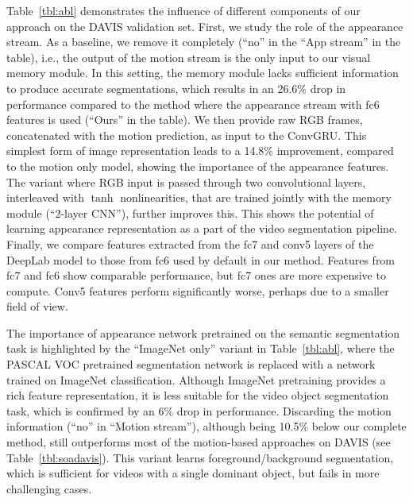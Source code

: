 \documentclass[10pt,twocolumn,letterpaper]{article}
\begin{document}
Table~\ref{tbl:abl} demonstrates the influence of different components of our
approach on the DAVIS validation set. First, we study the role of the
appearance stream. As a baseline, we remove it completely (``no'' in the ``App
stream'' in the table), i.e., the output of the motion stream is the only input
to our visual memory module. In this setting, the memory module lacks
sufficient information to produce accurate segmentations, which results in an
26.6\% drop in performance compared to the method where the appearance stream
with fc6 features is used (``Ours'' in the table). We then provide raw RGB
frames, concatenated with the motion prediction, as input to the ConvGRU. This
simplest form of image representation leads to a 14.8\% improvement, compared
to the motion only model, showing the importance of the appearance features.
The variant where RGB input is passed through two convolutional layers,
interleaved with $\tanh$ nonlinearities, that are trained jointly with the
memory module (``2-layer CNN''), further improves this. This shows the
potential of learning appearance representation as a part of the video
segmentation pipeline. Finally, we compare features extracted from the fc7 and
conv5 layers of the DeepLab model to those from fc6 used by default in our
method. Features from fc7 and fc6 show comparable performance, but fc7 ones are
more expensive to compute. Conv5 features perform significantly worse, perhaps
due to a smaller field of view.

The importance of appearance network pretrained on the semantic segmentation
task is highlighted by the ``ImageNet only'' variant in Table~\ref{tbl:abl},
where the PASCAL VOC pretrained segmentation network is replaced with a network
trained on ImageNet classification. Although ImageNet pretraining provides a
rich feature representation, it is less suitable for the video object
segmentation task, which is confirmed by an 6\% drop in performance. Discarding
the motion information (``no'' in ``Motion stream''), although being 10.5\%
below our complete method, still outperforms most of the motion-based
approaches on DAVIS (see Table~\ref{tbl:soadavis}). This variant learns
foreground/background segmentation, which is sufficient for videos with a
single dominant object, but fails in more challenging cases.
\end{document}
